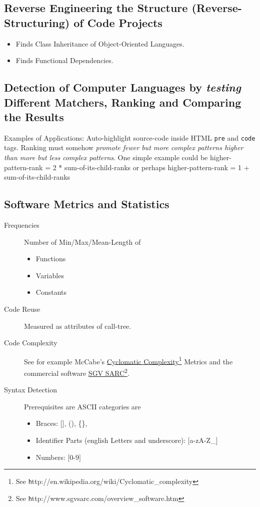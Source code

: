 \documentclass[a4paper,10pt,twocolumn]{article}
\newcommand{\hrefn}[2]{\href{#1}{#2}\footnote{See {\texttt #1}}} %
\begin{document}
\subsection{Reverse Engineering the Structure (Reverse-Structuring) of Code Projects}

\begin{itemize}
\item Finds Class Inheritance of Object-Oriented Languages.
\item Finds Functional Dependencies.
\end{itemize}

\subsection{Detection of Computer Languages by \emph{testing} Different Matchers,
  Ranking and Comparing the Results}

Examples of Applications: Auto-highlight source-code inside HTML \texttt{pre}
and \texttt{code} tags. Ranking must somehow \emph{promote fewer but more
  complex patterns higher than more but less complex patterns}. One simple
example could be {\centering higher-pattern-rank = 2 * sum-of-its-child-ranks }
or perhaps {\centering higher-pattern-rank = 1 + sum-of-its-child-ranks }

\subsection{Software Metrics and Statistics}

\begin{description}
\item[Frequencies] Number of Min/Max/Mean-Length of
  \begin{itemize}
  \item Functions
  \item Variables
  \item Constants
  \end{itemize}
\item[Code Reuse] Measured as attributes of call-tree.
\item[Code Complexity] See for example McCabe's
  \hrefn{http://en.wikipedia.org/wiki/Cyclomatic\_complexity}{Cyclomatic
    Complexity} Metrics and the commercial software
  \hrefn{http://www.sgvsarc.com/overview\_software.htm}{SGV SARC}.

\item[Syntax Detection] Prerequisites are ASCII categories are
  \begin{itemize} \item Braces: \mbox{$[$}\mbox{$]$}, (), \{\},
  \item Identifier Parts (english Letters and underscore):
    \mbox{$[$}a-zA-Z\_\mbox{$]$}
  \item Numbers: \mbox{$[$}0-9\mbox{$]$}
  \end{itemize}
\end{description}
\end{document}
